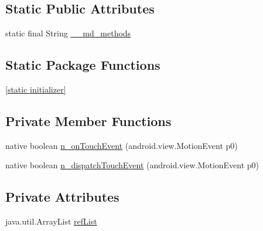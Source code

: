 \subsection*{Static Public Attributes}
\begin{CompactItemize}
\item 
static final String \hyperlink{classmd5b60ffeb829f638581ab2bb9b1a7f4f3f_1_1_platform___default_renderer_f4577cee8cad226436d0bce948786b98}{\_\-\_\-md\_\-methods}
\end{CompactItemize}
\subsection*{Static Package Functions}
\begin{CompactItemize}
\item 
\hyperlink{classmd5b60ffeb829f638581ab2bb9b1a7f4f3f_1_1_platform___default_renderer_d3580e0cf06f69f89c8dfef6e4f15136}{\mbox{[}static initializer\mbox{]}}
\end{CompactItemize}
\subsection*{Private Member Functions}
\begin{CompactItemize}
\item 
native boolean \hyperlink{classmd5b60ffeb829f638581ab2bb9b1a7f4f3f_1_1_platform___default_renderer_b0074968bde1ff3ab9249da5dcda2751}{n\_\-onTouchEvent} (android.view.MotionEvent p0)
\item 
native boolean \hyperlink{classmd5b60ffeb829f638581ab2bb9b1a7f4f3f_1_1_platform___default_renderer_099fc6dfc3ae7b6ee05e01cd5ae0716c}{n\_\-dispatchTouchEvent} (android.view.MotionEvent p0)
\end{CompactItemize}
\subsection*{Private Attributes}
\begin{CompactItemize}
\item 
java.util.ArrayList \hyperlink{classmd5b60ffeb829f638581ab2bb9b1a7f4f3f_1_1_platform___default_renderer_6a4513e1bfb8e75fe2e407dd4749c4f8}{refList}
\end{CompactItemize}


